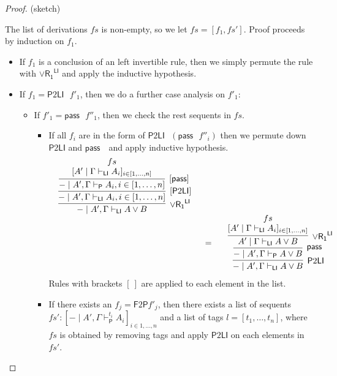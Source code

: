 \documentclass[submission,copyright,creativecommons]{eptcs}
\theoremstyle{definition}
\newcommand{\pass}{\mathsf{pass}}
\newcommand{\orrone}{\lor \mathsf{R_{1}}}
\newcommand{\LI}{\mathsf{LI}}
\newcommand{\Pass}{\mathsf{P}}
\newcommand{\F}{\mathsf{F}}
\newcommand{\proofbox}[1]{\begin{tabular}{l} #1 \end{tabular}}
\begin{document}
\begin{proof}
  (sketch)

  The list of derivations $fs$ is non-empty, so we let $fs = [f_1 , fs']$.
  Proof proceeds by induction on $f_1$.
  \begin{itemize}
    \item If $f_1$ is a conclusion of an left invertible rule, then we simply permute the rule with $\orrone^{\LI}$ and apply the inductive hypothesis.
    \item If $f_1 = \Pass 2 \LI \text{ } f'_1$, then we do a further case analysis on $f'_1$:
    \begin{itemize}
      \item If $f'_1 = \pass \text{ } f''_1$, then we check the rest sequents in $fs$. 
      \begin{itemize}
        \item If all $f_i$ are in the form of $\Pass 2 \LI \text{ } (\pass \text{ } f''_i)$ then we permute down $\Pass 2 \LI $ and $\pass \text{ }$ and apply inductive hypothesis.
        \begin{displaymath}
          \begin{array}{cc}
            \proofbox{
              \infer[\orrone^{\LI}]{- \mid A' , \Gamma \vdash_{\LI} A \lor B}{
                \infer[ {[\Pass 2 \LI]} ]{- \mid A' , \Gamma \vdash_{\LI} A_i , i \in [1 , \dots , n]}{
                  \infer[ {[\pass]} ]{- \mid A', \Gamma \vdash_{\Pass} A_i , i \in [1 , \dots , n]}{
                    \deduce{[A' \mid \Gamma \vdash_{\LI} A_i]_{i \in [1 , \dots , n]}}{fs}
                  }
                }
              }
            }
            \\[10pt]
            &
            =
            \quad
            \proofbox{
              \infer[\Pass 2 \LI]{- \mid A' , \Gamma \vdash_{\LI} A \lor B}{
                \infer[\pass]{- \mid A' , \Gamma \vdash_{\Pass} A \lor B}{
                  \infer[\orrone^{\LI}]{A' \mid \Gamma \vdash_{\LI} A \lor B}{
                    \deduce{[A' \mid \Gamma \vdash_{\LI} A_i]_{i \in [1 , \dots , n]}}{fs}
                  }
                }
              }
            }
          \end{array}
        \end{displaymath}
        Rules with brackets $[ \ ]$ are applied to each element in the list.
        \item If there exists an $f_j = \F 2 \Pass f'_j$, then there exists a list of sequents $fs' : [- \mid A' , \Gamma \vdash^{t_i}_{\Pass} A_i]_{i \in 1 , \dots , n}$ and a list of tags $l = [t_1 , \dots , t_n]$, where $fs$ is obtained by removing tags and apply $\Pass 2 \LI$ on each elements in $fs'$.

\end{itemize}
\end{itemize}
\end{itemize}
\end{proof}
\end{document}
